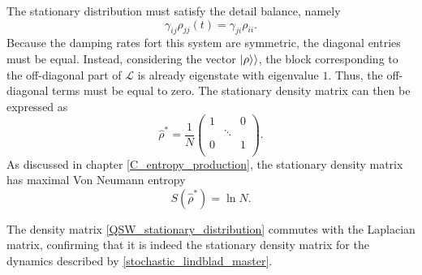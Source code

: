 The stationary distribution must satisfy the detail balance, namely
\begin{equation}
    \gamma_{ij}\rho_{jj}(t) = \gamma_{ji}\rho_{ii}.
\end{equation}
Because the damping rates fort this system are symmetric, the diagonal entries must be equal. 
Instead, considering the vector $\lvert\rho\rangle\rangle$, the block corresponding to the off-diagonal part of $\mathcal{L}$ is already eigenstate with eigenvalue $1$. Thus, the off-diagonal terms must be equal to zero.
The stationary density matrix can then be expressed as
\begin{equation}\label{QSW_stationary_distribution}
    \hat\rho^* = \frac{1}{N}\begin{pmatrix}
        1&&0\\
        &\ddots&\\
        0&&1\\
    \end{pmatrix}.
\end{equation}
As discussed in chapter \ref{C_entropy_production}, the stationary density matrix has maximal Von Neumann entropy 
\begin{equation}
    S\left(\hat\rho^*\right) = \ln N.
\end{equation}

The density matrix \eqref{QSW_stationary_distribution} commutes with the Laplacian matrix, confirming that it is indeed the stationary density matrix for the dynamics described by \eqref{stochastic_lindblad_master}.

\begin{comment}
    Instead, adding also the coherent part, we need to go in the basis $\{\ket{\lambda}\}$ eigenvector of $\hat L$. 
    The decoherent part becomes
    \begin{equation}
    \begin{split}
    \mathcal{L}^{cl}\ket{\lambda}\bra{\lambda} &= \sum_{ij}\gamma_{ij}\left[\hat J_{ij} \ket{\lambda}\bra{\lambda}\hat J_{ij}^\dagger -\frac{1}{2} \left\{ \hat J_{ij}^\dagger \hat J_{ij}, \ket{\lambda}\bra{\lambda}\right\}\right]\\
        &= \sum_{ij}\gamma_{ij}\left[\ket{i}\braket{j}{\lambda}\braket{\lambda}{j}\bra{i} -\frac{1}{2}\ket{j}\braket{i}{i}\braket{j}{\lambda}\bra{\lambda} - \frac{1}{2}\ket{\lambda}\braket{\lambda}{j}\braket{i}{i}\bra{j} \right]\\
        & = \sum_{ij}\gamma_{ij}\left[|\braket{j}{\lambda}|^2\ket{i}\bra{i} -\frac{1}{2}\ket{j}\braket{j}{\lambda}\bra{\lambda} - \frac{1}{2}\ket{\lambda}\braket{\lambda}{j}\bra{j} \right]\\
        &= \sum_{ij}\left[\pi_{ij}\rho_j\ket{i}\bra{i} -\frac{\pi_{ij}}{2}\braket{j}{\lambda}\ket{j}\bra{\lambda} - \frac{\pi_{ij}}{2}\braket{\lambda}{j}\ket{\lambda}\bra{j} \right]
    \end{split}
\end{equation}
\end{comment}
